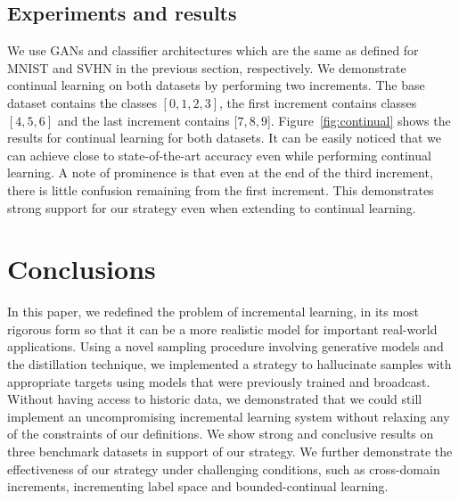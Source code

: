 \documentclass[10pt,twocolumn,letterpaper]{article}
\begin{document}
	\subsection{Experiments and results}
	We use GANs and classifier architectures which are the same as defined for MNIST and SVHN in the previous section, respectively.
	We demonstrate continual learning on both datasets by performing two increments.
	The base dataset contains the classes $[0,1,2,3]$, the first increment contains classes $[4,5,6]$ and the last increment contains $[7,8,9$]. 
	Figure~\ref{fig:continual} shows the results for continual learning for both datasets.
	It can be easily noticed that we can achieve close to state-of-the-art accuracy even while performing continual learning. 
	A note of prominence is that even at the end of the third increment, there is little confusion remaining from the first increment. 
	This demonstrates strong support for our strategy even when extending to continual learning. 
	
	\section{Conclusions}
	\label{sec:conclusion}
	
	In this paper, we redefined the problem of incremental learning, in its most rigorous form so that it can be a more realistic model for important real-world applications. 
	Using a novel sampling procedure involving generative models and the distillation technique, we implemented a strategy to hallucinate samples with appropriate targets using models that were previously trained and broadcast. 
	Without having access to historic data, we demonstrated that we could still implement an uncompromising incremental learning system without relaxing any of the constraints of our definitions. We show strong and conclusive results on three benchmark datasets in support of our strategy. 
	We further demonstrate the effectiveness of our strategy under challenging conditions, such as cross-domain increments, incrementing label space and bounded-continual learning.
	
	


	
{\small
	
	
}	
\end{document}

